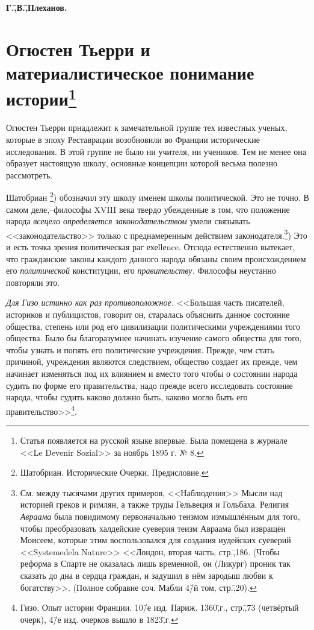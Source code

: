 \newpage
\noindent\textbf{Г.\=,В.\=,Плеханов.}
\section*{Огюстен Тьерри и материалистическое понимание истории\footnote{Статья появляется на русской языке впервые. Была помещена в журнале <<Le Devenir Sozial>> за ноябрь 1895 г. № 8.}}
\label{sec:5}

Огюстен Тьерри прнадлежит к замечательной группе тех известных ученых, которые в эпоху Реставрации возобновили во Франции исторические исследования. В этой группе не было ни учителя, ни учеников. Тем не менее она образует настоящую школу, основные концепции которой весьма полезно рассмотреть.

Шатобриан \footnote{Шатобриан. Исторические Очерки. Предисловие.}) обозначил эту школу именем школы политической. Это не точно. В самом деле,\---философы XVIII века твердо убежденные в том, что положение народа \emph{всецело определяется законодательством} умели связывать <<законодательство>> только с преднамеренным действием законодателя.\footnote{См. между тысячами других примеров, <<Наблюдения>> Мысли над историей греков и римлян, а также труды Гельвеция и Гольбаха. Религия \emph{Авраама} была повидимому первоначально теизмом измышлённым для того, чтобы преобразовать халдейские суеверия теизм Авраама был извращён Моисеем, которые этим воспользовался для создания иудейских суеверий <<Systemedela Nature>> <<Лондон, вторая часть, стр.\=,186. (Чтобы реформа в Спарте не оказалась лишь временной, он (Ликург) проник так сказать до дна в сердца граждан, и задушил в нём зародыш любви к богатству>>. (Полное собравие соч. Мабли
4\=/й том, стр.\=,20).}) Это и есть точка зрения политическая раг ехеllеnce. Отсюда естественно вытекает, что гражданские законы каждого данного народа обязаны своим происхождением его \emph{политической} конституции, его \emph{правительству.} Философы неустанно повторяли это.

\emph{Для Гизо истинно как раз противоположное.} <<Большая часть писателей, историков и публицистов, говорит он, старалась объяснить данное состояние общества, степень или род его цивилизации политическими учреждениями того общества. Было бы благоразумнее начинать изучение самого общества для того, чтобы узнать и попять его политические учреждения. Прежде, чем стать причиной, учреждения являются следствием, общество создает их прежде, чем начинает изменяться под их влиянием и вместо того чтобы о состоянии народа судить по форме его правительства, надо прежде всего исследовать состояние народа, чтобы судить каково должно быть, каково могло быть его правительство>>\footnote{Гизо. Опыт истории Франции. 10\=/е изд. Париж. 1360\=,г., стр.\=,73 (четвёртый очерк), 4\=/е изд. очерков вышло в 1823\=,г.}.

